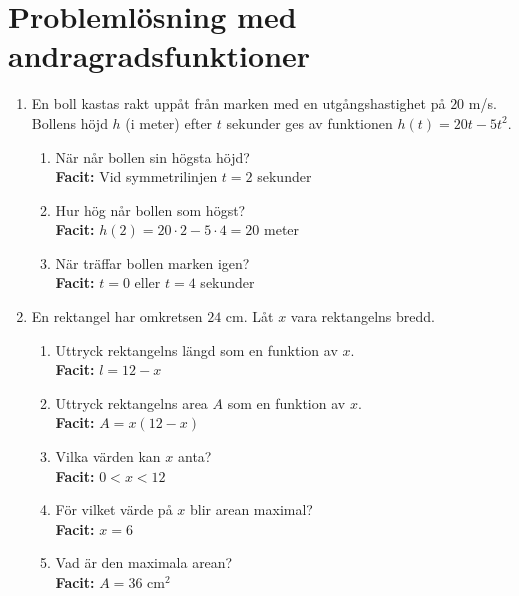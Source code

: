 \documentclass[a4paper,11pt]{article}
\begin{document}
\section{Problemlösning med andragradsfunktioner}

\begin{enumerate}[label=\textbf{\arabic*.}]
    \item En boll kastas rakt uppåt från marken med en utgångshastighet på $20$ m/s. Bollens höjd $h$ (i meter) efter $t$ sekunder ges av funktionen $h(t) = 20t - 5t^2$. 
    \begin{enumerate}[label=\alph*)]
        \item När når bollen sin högsta höjd?
        \\ \textbf{Facit:} Vid symmetrilinjen $t=2$ sekunder
        \item Hur hög når bollen som högst?
        \\ \textbf{Facit:} $h(2) = 20\cdot2 - 5\cdot4 = 20$ meter
        \item När träffar bollen marken igen?
        \\ \textbf{Facit:} $t=0$ eller $t=4$ sekunder
    \end{enumerate}
    
    \item En rektangel har omkretsen $24$ cm. Låt $x$ vara rektangelns bredd.
    \begin{enumerate}[label=\alph*)]
        \item Uttryck rektangelns längd som en funktion av $x$.
        \\ \textbf{Facit:} $l = 12-x$
        \item Uttryck rektangelns area $A$ som en funktion av $x$.
        \\ \textbf{Facit:} $A = x(12-x)$
        \item Vilka värden kan $x$ anta?
        \\ \textbf{Facit:} $0 < x < 12$
        \item För vilket värde på $x$ blir arean maximal?
        \\ \textbf{Facit:} $x=6$
        \item Vad är den maximala arean?
        \\ \textbf{Facit:} $A=36$ cm$^2$
    \end{enumerate}
\end{enumerate}
\end{document}
